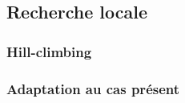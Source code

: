 
\subsection{Recherche locale}

\subsubsection{Hill-climbing}
\subsubsection{Adaptation au cas présent}
